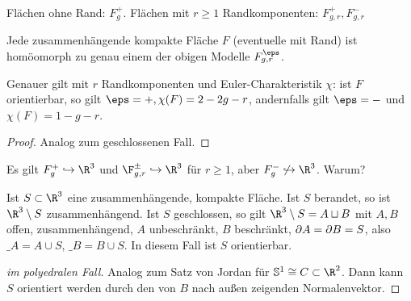 
Flächen ohne Rand: $F_g^+$.
Flächen mit $r \ge 1$ Randkomponenten: $F_{g,r}^+, F_{g,r}^-$

\begin{st}
	Jede zusammenhängende kompakte Fläche $F$ (eventuelle mit Rand) ist homöomorph zu genau einem der obigen Modelle $F_{g,r}^\eps$.

	Genauer gilt mit $r$ Randkomponenten und Euler-Charakteristik $\chi$: ist $F$ orientierbar, so gilt $\eps = +, \chi(F) = 2 - 2g - r$, andernfalls gilt $\eps = -$ und $\chi(F) = 1 - g - r$.
	\begin{proof}
		Analog zum geschlossenen Fall.
	\end{proof}
\end{st}

Es gilt $F_g^+ \injto \R^3$ und $\F_{g,r}^{\pm} \injto \R^3$ für $r \ge 1$, aber $F_g^- \not\injto \R^3$. Warum?

\begin{st}
	Ist $S \subset \R^3$ eine zusammenhängende, kompakte Fläche.
	Ist $S$ berandet, so ist $\R^3 \setminus S$ zusammenhängend.
	Ist $S$ geschlossen, so gilt $\R^3 \setminus S = A \dunion B$ mit $A, B$ offen, zusammenhängend, $A$ unbeschränkt, $B$ beschränkt, $\partial A = \partial B = S$, also $\_A = A \cup S$, $\_B = B \cup S$.
	In diesem Fall ist $S$ orientierbar.
	\begin{proof}[im polyedralen Fall]
		Analog zum Satz von Jordan für $\S^1 \homeomorphic C \subset \R^2$.
		Dann kann $S$ orientiert werden durch den von $B$ nach außen zeigenden Normalenvektor.
	\end{proof}
\end{st}
